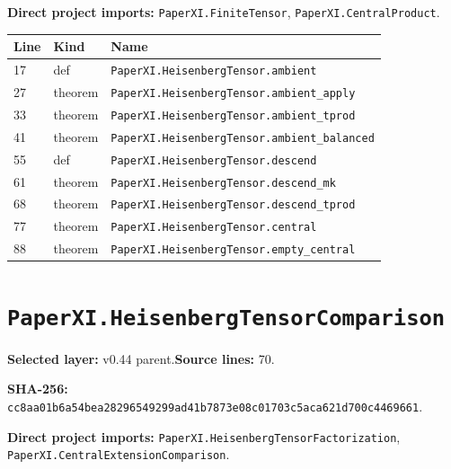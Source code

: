 \documentclass[10pt,oneside]{book}
\begin{document}
\textbf{Direct project imports:} \nolinkurl{PaperXI.FiniteTensor}, \nolinkurl{PaperXI.CentralProduct}.

\begin{longtable}{@{}p{}p{}p{}@{}}\toprule Line&Kind&Name\\\midrule\endhead

17&def&\nolinkurl{PaperXI.HeisenbergTensor.ambient}\\

27&theorem&\nolinkurl{PaperXI.HeisenbergTensor.ambient_apply}\\

33&theorem&\nolinkurl{PaperXI.HeisenbergTensor.ambient_tprod}\\

41&theorem&\nolinkurl{PaperXI.HeisenbergTensor.ambient_balanced}\\

55&def&\nolinkurl{PaperXI.HeisenbergTensor.descend}\\

61&theorem&\nolinkurl{PaperXI.HeisenbergTensor.descend_mk}\\

68&theorem&\nolinkurl{PaperXI.HeisenbergTensor.descend_tprod}\\

77&theorem&\nolinkurl{PaperXI.HeisenbergTensor.central}\\

88&theorem&\nolinkurl{PaperXI.HeisenbergTensor.empty_central}\\

\bottomrule\end{longtable}

\section{\texorpdfstring{\nolinkurl{PaperXI.HeisenbergTensorComparison}}{PaperXI.HeisenbergTensorComparison}}\label{module:PaperXI.HeisenbergTensorComparison}

\textbf{Selected layer:} v0.44 parent.\quad\textbf{Source lines:} 70.\par\textbf{SHA-256:} {\scriptsize\nolinkurl{cc8aa01b6a54bea28296549299ad41b7873e08c01703c5aca621d700c4469661}}.


\textbf{Direct project imports:} \nolinkurl{PaperXI.HeisenbergTensorFactorization}, \nolinkurl{PaperXI.CentralExtensionComparison}.
\end{document}
